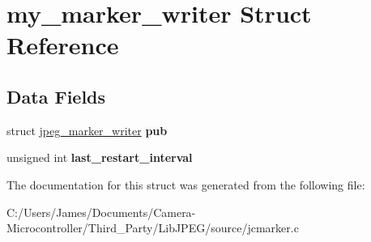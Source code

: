 \hypertarget{structmy__marker__writer}{}\section{my\+\_\+marker\+\_\+writer Struct Reference}
\label{structmy__marker__writer}
\subsection*{Data Fields}
\begin{DoxyCompactItemize}
\item 
\mbox{\label{structmy__marker__writer_a52d36522f8c58baa74a43e2670929b7d}} 
struct \hyperlink{structjpeg__marker__writer}{jpeg\+\_\+marker\+\_\+writer} {\bfseries pub}
\item 
\mbox{\label{structmy__marker__writer_a495aaa80bdbdd85fce5835ec6835b440}} 
unsigned int {\bfseries last\+\_\+restart\+\_\+interval}
\end{DoxyCompactItemize}


The documentation for this struct was generated from the following file\+:\begin{DoxyCompactItemize}
\item 
C\+:/\+Users/\+James/\+Documents/\+Camera-\/\+Microcontroller/\+Third\+\_\+\+Party/\+Lib\+J\+P\+E\+G/source/jcmarker.\+c\end{DoxyCompactItemize}
